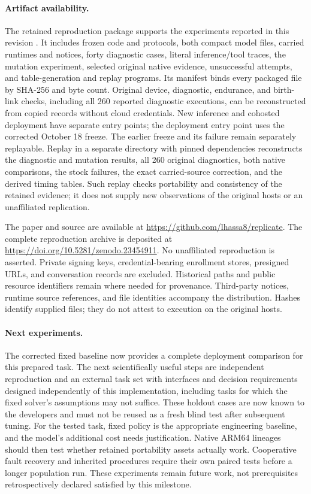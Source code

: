 \documentclass[11pt,letterpaper]{article}
\begin{document}
\paragraph{Artifact availability.}
The retained reproduction package supports the experiments reported in
this revision \cite{repropackage}.
It includes frozen code and protocols, both compact model files, carried
runtimes and notices, forty diagnostic cases, literal inference/tool traces,
the mutation experiment, selected original native evidence, unsuccessful
attempts, and table-generation and replay programs. Its manifest binds every
packaged file by SHA-256 and byte count. Original device, diagnostic, endurance,
and birth-link checks, including all 260 reported diagnostic executions,
can be reconstructed from copied records without cloud
credentials. New inference and cohosted deployment have separate entry points;
the deployment entry point uses the corrected October 18 freeze. The earlier
freeze and its failure remain separately replayable. Replay in a separate
directory with pinned dependencies reconstructs the diagnostic and mutation
results, all 260 original diagnostics, both native comparisons, the stock
failures, the exact carried-source correction, and the derived timing tables. Such replay checks portability
and consistency of the retained evidence; it does not supply new observations
of the original hosts or an unaffiliated replication.

The paper and source are available at \url{https://github.com/lhassa8/replicate}.
The complete reproduction archive is deposited at \url{https://doi.org/10.5281/zenodo.23454911}.
No unaffiliated reproduction is asserted. Private signing keys,
credential-bearing enrollment stores, presigned URLs, and conversation records
are excluded. Historical paths and public resource identifiers remain where
needed for provenance. Third-party notices, runtime source references, and
file identities accompany the distribution. Hashes identify supplied files;
they do not attest to execution on the original hosts.

\paragraph{Next experiments.}
The corrected fixed baseline now provides a complete deployment comparison for
this prepared task. The next scientifically useful steps are independent
reproduction and an external task set with interfaces
and decision requirements designed independently of this implementation,
including tasks for which the fixed solver's assumptions may not suffice.
These holdout cases are now known to the developers and must not be reused as
a fresh blind test after subsequent tuning. For the tested
task, fixed policy is the appropriate engineering baseline, and the model's
additional cost needs justification. Native ARM64 lineages should then test whether retained
portability assets actually work. Cooperative fault recovery and inherited
procedures require their own paired tests before a longer population run.
These experiments remain future work, not prerequisites retrospectively
declared satisfied by this milestone.
\end{document}
